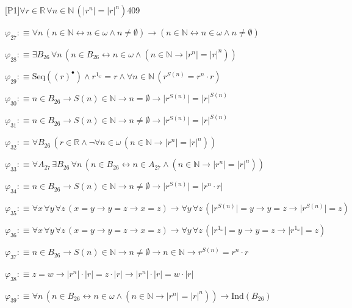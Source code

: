 \begin{fullproof}{[P1]}{$\forall r \in \mathbb{R}\,\forall n \in \mathbb{N}\,(\lvert {{r}^{n}} \rvert = {{\lvert r \rvert}^{n}})$}{409}
\begin{abbrevlist}
\item $\varphi_{27} :\equiv \forall n\,(n \in \mathbb{N} \leftrightarrow n \in \omega \land n \neq \emptyset) \to (n \in \mathbb{N} \leftrightarrow n \in \omega \land n \neq \emptyset)$
\item $\varphi_{28} :\equiv \exists B_{26}\,\forall n\,(n \in B_{26} \leftrightarrow n \in \omega \land (n \in \mathbb{N} \to \lvert {{r}^{n}} \rvert = {{\lvert r \rvert}^{n}}))$
\item $\varphi_{29} :\equiv \mathrm{Seq}({(r)^{\bullet}}) \land {{r}^{1_{\omega}}} = r \land \forall n \in \mathbb{N}\,({{r}^{S(n)}} = {{r}^{n}} \cdot r)$
\item $\varphi_{30} :\equiv n \in B_{26} \to S(n) \in \mathbb{N} \to n = \emptyset \to \lvert {{r}^{S(n)}} \rvert = {{\lvert r \rvert}^{S(n)}}$
\item $\varphi_{31} :\equiv n \in B_{26} \to S(n) \in \mathbb{N} \to n \neq \emptyset \to \lvert {{r}^{S(n)}} \rvert = {{\lvert r \rvert}^{S(n)}}$
\item $\varphi_{32} :\equiv \forall B_{26}\,(r \in \mathbb{R} \land \neg \forall n \in \omega\,(n \in \mathbb{N} \to \lvert {{r}^{n}} \rvert = {{\lvert r \rvert}^{n}}))$
\item $\varphi_{33} :\equiv \forall A_{27}\,\exists B_{26}\,\forall n\,(n \in B_{26} \leftrightarrow n \in A_{27} \land (n \in \mathbb{N} \to \lvert {{r}^{n}} \rvert = {{\lvert r \rvert}^{n}}))$
\item $\varphi_{34} :\equiv n \in B_{26} \to S(n) \in \mathbb{N} \to n \neq \emptyset \to \lvert {{r}^{S(n)}} \rvert = \lvert {{r}^{n}} \cdot r \rvert$
\item $\varphi_{35} :\equiv \forall x\,\forall y\,\forall z\,(x = y \to y = z \to x = z) \to \forall y\,\forall z\,(\lvert {{r}^{S(n)}} \rvert = y \to y = z \to \lvert {{r}^{S(n)}} \rvert = z)$
\item $\varphi_{36} :\equiv \forall x\,\forall y\,\forall z\,(x = y \to y = z \to x = z) \to \forall y\,\forall z\,(\lvert {{r}^{1_{\omega}}} \rvert = y \to y = z \to \lvert {{r}^{1_{\omega}}} \rvert = z)$
\item $\varphi_{37} :\equiv n \in B_{26} \to S(n) \in \mathbb{N} \to n \neq \emptyset \to n \in \mathbb{N} \to {{r}^{S(n)}} = {{r}^{n}} \cdot r$
\item $\varphi_{38} :\equiv z = w \to \lvert {{r}^{n}} \rvert \cdot \lvert r \rvert = z \cdot \lvert r \rvert \to \lvert {{r}^{n}} \rvert \cdot \lvert r \rvert = w \cdot \lvert r \rvert$
\item $\varphi_{39} :\equiv \forall n\,(n \in B_{26} \leftrightarrow n \in \omega \land (n \in \mathbb{N} \to \lvert {{r}^{n}} \rvert = {{\lvert r \rvert}^{n}})) \to \mathrm{Ind}(B_{26})$

\end{abbrevlist}
\end{fullproof}
